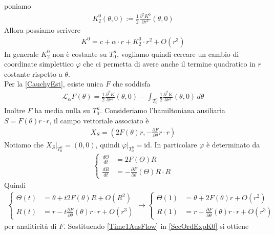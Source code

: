 \documentclass[twoside, 11pt]{amsbook}
\makeatletter
\newcommand{\0}{{(0)}}
\newcommand{\3}{{(3)}}
\theoremstyle{colonplain}
\theoremstyle{colondefinition}
\theoremstyle{colonremark}
\numberwithin{equation}{chapter}
\renewcommand{\proofname}{Dimostrazione}
\renewenvironment{proof}[1][\proofname]{\par
  \pushQED{\qed}%
  \normalfont \topsep6\p@\@plus6\p@\relax
  \trivlist
  \item[\hskip\labelsep\bfseries #1:]\ignorespaces
}{%
  \popQED\endtrivlist\@endpefalse
}
\makeatother
\begin{document}
\begin{proof} poniamo
\begin{align}
    K^0_2(\theta, 0) := \frac{1}{2}\frac{\partial^2 K^0}{\partial r^2}(\theta, 0) 
\end{align}
Allora possiamo scrivere
\begin{align}\label{SecOrdExpK0}
    K^0 = c + \alpha \cdot r + K^0_2 \cdot r^2 + O(r^3) 
\end{align}
In generale $K^0_2$ non è costante su $T^n_0$, vogliamo quindi cercare un cambio di coordinate simplettico $\varphi$ che ci permetta di avere anche il termine quadratico in $r$ costante rispetto a $\theta$. \\
Per la \ref{CauchyEst}, esiste unica $F$ che soddisfa
\begin{align}
    \mathcal{L}_\alpha F(\theta) = \frac{1}{2}\frac{\partial^2 K}{\partial r^2}(\theta, 0) - \int_{T^n_0} \frac{1}{2}\frac{\partial^2 K}{\partial r^2}(\theta, 0) \, d\theta 
\end{align}
Inoltre $F$ ha media nulla su $T^n_0$. Consideriamo l'hamiltoniana ausiliaria $S = F(\theta)r \cdot r$, il campo vettoriale associato è
\begin{align}
    X_S = \left(2F(\theta)r,-\frac{\partial F}{\partial \theta}r \cdot r\right) 
\end{align}
Notiamo che $X_S|_{T^n_0} = (0, 0)$, quindi $\varphi|_{T^n_0} = \mathrm{id}$. In particolare $\varphi$ è determinato da
\begin{align}
    \begin{cases}
        \frac{d\Theta}{dt} &= 2F(\Theta)R \\
        \frac{dR}{dt} &= -\frac{\partial F}{\partial \theta}(\Theta)R \cdot R
    \end{cases} 
\end{align}
Quindi
\begin{align}\label{Time1AusFlow}
    \begin{cases}
        \Theta(t) &= \theta + t2F(\theta)R + O(R^2) \\
        R(t) &= r - t\frac{\partial F}{\partial \theta}(\theta)r \cdot r + O(r^3)
    \end{cases} \rightarrow \begin{cases}
        \Theta(1) &= \theta + 2F(\theta)r + O(r^2) \\
        R(1) &= r - \frac{\partial F}{\partial \theta}(\theta)r \cdot r + O(r^3)
    \end{cases} 
\end{align}
per analiticità di $F$. Sostituendo \eqref{Time1AusFlow} in \eqref{SecOrdExpK0} si ottiene

\end{proof}
\end{document}
